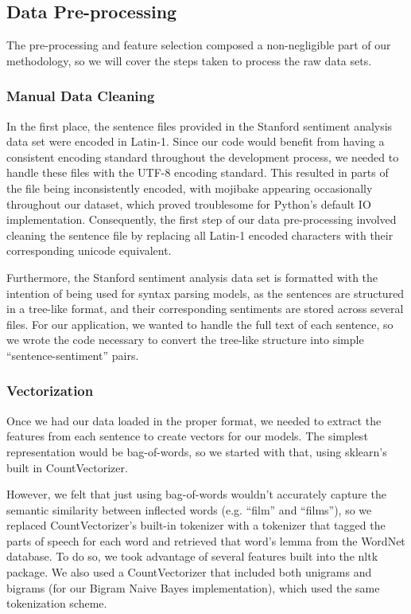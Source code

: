 \documentclass[conference]{IEEEtran}
\begin{document}
\subsection{Data Pre-processing}

The pre-processing and feature selection composed a non-negligible part of our methodology, so we will cover the steps taken to process the raw data sets. 

\subsubsection{Manual Data Cleaning}

In the first place, the sentence files provided in the Stanford sentiment analysis data set were encoded in Latin-1. Since our code would benefit from having a consistent encoding standard throughout the development process, we needed to handle these files with the UTF-8 encoding standard. This resulted in parts of the file being inconsistently encoded, with mojibake appearing occasionally throughout our dataset, which proved troublesome for Python's default IO implementation. Consequently, the first step of our data pre-processing involved cleaning the sentence file by replacing all Latin-1 encoded characters with their corresponding unicode equivalent.

Furthermore, the Stanford sentiment analysis data set is formatted with the intention of being used for syntax parsing models, as the sentences are structured in a tree-like format, and their corresponding sentiments are stored across several files. For our application, we wanted to handle the full text of each sentence, so we wrote the code necessary to convert the tree-like structure into simple ``sentence-sentiment'' pairs.

\subsubsection{Vectorization}

Once we had our data loaded in the proper format, we needed to extract the features from each sentence to create vectors for our models. The simplest representation would be bag-of-words, so we started with that, using sklearn's built in CountVectorizer.

However, we felt that just using bag-of-words wouldn't accurately capture the semantic similarity between inflected words (e.g. ``film'' and ``films''), so we replaced CountVectorizer's built-in tokenizer with a tokenizer that tagged the parts of speech for each word and retrieved that word's lemma from the WordNet database. To do so, we took advantage of several features built into the nltk package. We also used a CountVectorizer that included both unigrams and bigrams (for our Bigram Naive Bayes implementation), which used the same tokenization scheme. 
\end{document}
